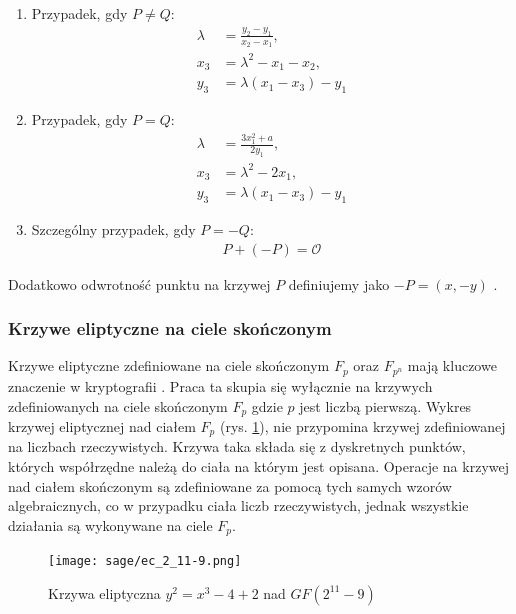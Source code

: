 \begin{enumerate}
    \item Przypadek, gdy \( P \neq Q \):
          \begin{align}
              \lambda & = \frac{y_2 - y_1}{x_2 - x_1}, \\
              x_3     & = \lambda^2 - x_1 - x_2,       \\
              y_3     & = \lambda(x_1 - x_3) - y_1
          \end{align}
    \item Przypadek, gdy \( P = Q \):
          \begin{align*}
              \lambda & = \frac{3x_1^2 + a}{2y_1}, \\
              x_3     & = \lambda^2 - 2x_1,        \\
              y_3     & = \lambda(x_1 - x_3) - y_1
          \end{align*}
    \item Szczególny przypadek, gdy \( P = -Q \):
          \begin{align*}
              P + (-P) = \mathcal{O}
          \end{align*}
\end{enumerate}
Dodatkowo odwrotność punktu na krzywej $P$ definiujemy jako $-P = (x, -y)$ \cite{Stinson2021}.


\subsubsection{Krzywe eliptyczne na ciele skończonym}
Krzywe eliptyczne zdefiniowane na ciele skończonym $F_p$ oraz $F_{p^n}$ mają kluczowe znaczenie w kryptografii \cite{Stinson2021}.
Praca ta skupia się wyłącznie na krzywych zdefiniowanych na ciele skończonym $F_p$ gdzie $p$ jest liczbą pierwszą.
Wykres krzywej eliptycznej nad ciałem $F_p$ (rys. \ref{fig:krzywa_fp}),
nie przypomina krzywej zdefiniowanej na liczbach rzeczywistych.
Krzywa taka składa się z dyskretnych punktów, których współrzędne należą do ciała
na którym jest opisana.
Operacje na krzywej nad ciałem skończonym są zdefiniowane
za pomocą tych samych wzorów algebraicznych, co w przypadku ciała liczb rzeczywistych,
jednak wszystkie działania są wykonywane na ciele $F_p$.
\begin{figure}[!h]
    \centering \texttt{[image: sage/ec\_2\_11-9.png]}
    \caption{Krzywa eliptyczna $y^2=x^3-4+2$ nad $GF(2^{11} - 9)$}
    \label{fig:krzywa_fp}
\end{figure}


